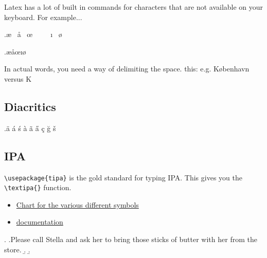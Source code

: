 \documentclass[letterpaper]{article}
\begin{document}
Latex has a lot of built in commands for characters that are not available on your keyboard.  For example...

\ex.\ae~ \aa~ \oe~ \textthorn~ \textwynn~ \i~ \o~




\ex.\ae \aa \oe \textthorn \textwynn \i \o

In actual words, you need a way of delimiting the space. this:  e.g. K{\o}benhavn versus K\obenhavn




\subsection{Diacritics}

\ex.\"a \'a \'s \`a \~a \H{a}  \c{c} \u{g} \v{s} 



\subsection{IPA}

\texttt{\textbackslash usepackage\{tipa\}} is the gold standard for typing IPA.  This gives you the \texttt{\textbackslash textipa\{\}} function.

\begin{itemize} %
    \item \href{https://jon.dehdari.org/tutorials/tipachart_mod.pdf}{Chart for the various different symbols}
    \item \href{https://www.tug.org/tugboat/tb17-2/tb51rei.pdf}{documentation}
\end{itemize}


\ex.
\a.Please call Stella and ask her to bring those sticks of butter with her from the store.
\b.
\b.
\end{document}
